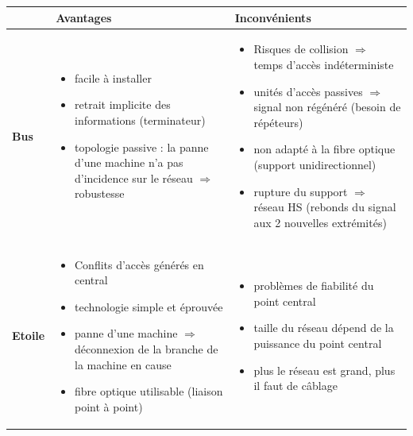 \documentclass[11pt,english,french]{scrreprt}
\theoremstyle{remark}
\theoremstyle{definition}
\begin{document}
\begin{table}
\begin{tabularx}{\textwidth}{>{\bfseries}lXX} 
	\toprule
	 						& Avantages & Inconvénients\\[0.05in]\bottomrule
	Bus 	& \begin{itemize}
	\item facile à installer
	\item retrait implicite des informations (terminateur)
	\item topologie passive : la panne d'une machine n'a pas d'incidence sur le réseau $\Rightarrow$ robustesse
	\end{itemize} & \begin{itemize}
		\item Risques de collision $\Rightarrow$ temps d'accès indéterministe
		\item unités d'accès passives $\Rightarrow$ signal non régénéré (besoin de répéteurs)
		\item non adapté à la fibre optique (support unidirectionnel)
		\item rupture du support $\Rightarrow$ réseau HS (rebonds du signal aux 2 nouvelles extrémités)
	\end{itemize} \\[0.05in]
		
	Etoile 	& \begin{itemize}
		\item Conflits d'accès générés en central
		\item technologie simple et éprouvée
		\item panne d'une machine $\Rightarrow$ déconnexion de la branche de la machine en cause
		\item fibre optique utilisable (liaison point à point)
	\end{itemize} & \begin{itemize}
		\item problèmes de fiabilité du point central
		\item taille du réseau dépend de la puissance du point central
		\item plus le réseau est grand, plus il faut de câblage
	\end{itemize}\\[0.05in]
	

\end{tabularx}
\end{table}
\end{document}

